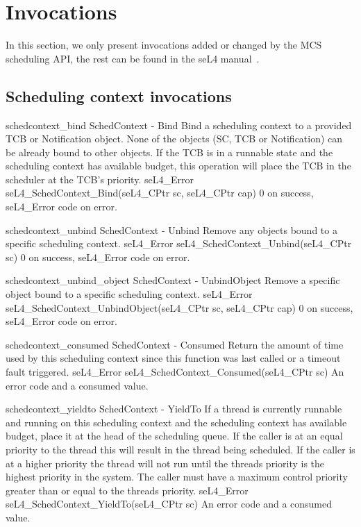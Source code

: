 \section{Invocations}

In this section, we only present invocations added or changed by the MCS scheduling API, the rest
can be found in the seL4 manual~\citep{seL417}. 

\subsection{Scheduling context invocations}
\label{api:sc}
\apidoc
{schedcontext_bind}
{SchedContext - Bind}
{ Bind a scheduling context to a provided TCB or Notification object. None of the objects (SC, TCB
or Notification) can be already bound to other objects. If the TCB is in a runnable state and the
scheduling context has available budget, this operation will place the TCB in the scheduler at the
TCB's priority.}
{seL4_Error seL4_SchedContext_Bind(seL4_CPtr sc, seL4_CPtr cap)}
{
}
{0 on success, seL4\_Error code on error.}

\apidoc
{schedcontext_unbind}
{SchedContext - Unbind}
{ Remove any objects bound to a specific scheduling context.}
{seL4_Error seL4_SchedContext_Unbind(seL4_CPtr sc)}
{
}
{0 on success, seL4\_Error code on error.}

\apidoc
{schedcontext_unbind_object}
{SchedContext - UnbindObject}
{ Remove a specific object bound to a specific scheduling context.}
{seL4_Error seL4_SchedContext_UnbindObject(seL4_CPtr sc, seL4_CPtr cap)}
{
}
{0 on success, seL4\_Error code on error.}

\apidoc
{schedcontext_consumed}
{SchedContext - Consumed}
{ Return the amount of time used by this scheduling context since this function
    was last called or a timeout fault triggered.}
    {seL4_Error seL4_SchedContext_Consumed(seL4_CPtr sc)}
{
}
{An error code and a  consumed value.}

\apidoc
{schedcontext_yieldto}
{SchedContext - YieldTo}
{ 
   If a thread is currently runnable and running on this scheduling context and the scheduling context has available budget, place it at the head of the scheduling queue.
              If the caller is at an equal priority to the thread this will result in the thread being scheduled.
              If the caller is at a higher priority the thread will not run until the threads priority is the highest priority in the system.
              The caller must have a maximum control priority greater than or equal to the threads priority.
}
{seL4_Error seL4_SchedContext_YieldTo(seL4_CPtr sc)}
{
}
{An error code and a  consumed value.}

